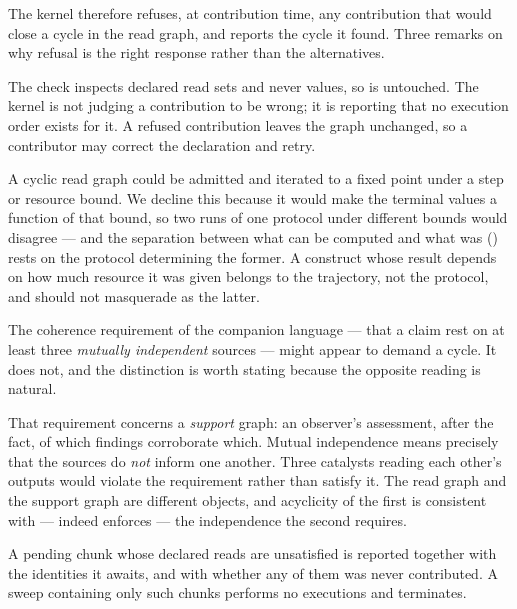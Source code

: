 The kernel therefore refuses, at contribution time, any contribution that
would close a cycle in the read graph, and reports the cycle it found. Three
remarks on why refusal is the right response rather than the alternatives.

\begin{remark}
\label{rem:refusal-inert}
The check inspects declared read sets and never values, so
 is untouched. The kernel is not judging a contribution to
be wrong; it is reporting that no execution order exists for it. A refused
contribution leaves the graph unchanged, so a contributor may correct the
declaration and retry.
\end{remark}

\begin{remark}
\label{rem:no-fixpoint}
A cyclic read graph could be admitted and iterated to a fixed point under a
step or resource bound. We decline this because it would make the terminal
values a function of that bound, so two runs of one protocol under different
bounds would disagree --- and the separation between what can be computed and
what was () rests on the protocol determining the former.
A construct whose result depends on how much resource it was given belongs to
the trajectory, not the protocol, and should not masquerade as the latter.
\end{remark}

\begin{remark}
\label{rem:not-coherence}
The coherence requirement of the companion language --- that a claim rest on
at least three \emph{mutually independent} sources --- might appear to demand
a cycle. It does not, and the distinction is worth stating because the
opposite reading is natural.

That requirement concerns a \emph{support} graph: an observer's assessment,
after the fact, of which findings corroborate which. Mutual independence
means precisely that the sources do \emph{not} inform one another. Three
catalysts reading each other's outputs would violate the requirement rather
than satisfy it. The read graph and the support graph are different objects,
and acyclicity of the first is consistent with --- indeed enforces --- the
independence the second requires.
\end{remark}

\begin{proposition}
\label{prop:blocked}
A pending chunk whose declared reads are unsatisfied is reported together with
the identities it awaits, and with whether any of them was never contributed.
A sweep containing only such chunks performs no executions and terminates.
\end{proposition}


